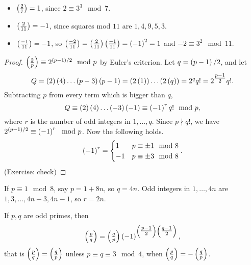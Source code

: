 \begin{example2}
\hfill
\begin{itemize}
\item $ \left( \tfrac{2}{7} \right) = 1 $, since $ 2 \equiv 3^3 \mod 7 $.
\item $ \left( \tfrac{2}{11} \right) = -1 $, since squares mod $ 11 $ are $ 1, 4, 9, 5, 3 $.
\item $ \left( \tfrac{-1}{11} \right) = -1 $, so $ \left( \tfrac{-2}{11} \right) = \left( \tfrac{2}{11} \right)\left( \tfrac{-1}{11} \right) = \left( -1 \right)^2 = 1 $ and $ -2 \equiv 3^2 \mod 11 $.
\end{itemize}
\end{example2}

\begin{proof}
$ \left( \tfrac{2}{p} \right) \equiv 2^{\left( p - 1 \right) / 2} \mod p $ by Euler's criterion. Let $ q = \left( p - 1 \right) / 2 $, and let
$$ Q = \left( 2 \right)\left( 4 \right) \dots \left( p - 3 \right)\left( p - 1 \right) = \left( 2\left( 1 \right) \right) \dots \left( 2\left( q \right) \right) = 2^qq! = 2^{\tfrac{p - 1}{2}}q!. $$
Subtracting $ p $ from every term which is bigger than $ q $,
$$ Q \equiv \left( 2 \right)\left( 4 \right) \dots \left( -3 \right)\left( -1 \right) \equiv \left( -1 \right)^rq! \mod p, $$
where $ r $ is the number of odd integers in $ 1, \dots, q $. Since $ p \nmid q! $, we have $ 2^{\left( p - 1 \right) / 2} \equiv \left( -1 \right)^r \mod p $. Now the following holds.
$$ \left( -1 \right)^r = \begin{cases}
1 & p \equiv \pm 1 \mod 8 \\
-1 & p \equiv \pm 3 \mod 8
\end{cases}. $$
(Exercise: check)
\end{proof}

\begin{example2}
If $ p \equiv 1 \mod 8 $, say $ p = 1 + 8n $, so $ q = 4n $. Odd integers in $ 1, \dots, 4n $ are $ 1, 3, \dots, 4n - 3, 4n - 1 $, so $ r = 2n $.
\end{example2}

\begin{theorem}
\label{thm:40}
If $ p, q $ are odd primes, then
$$ \left( \tfrac{p}{q} \right) = \left( \tfrac{q}{p} \right)\left( -1 \right)^{\left( \tfrac{p - 1}{2} \right)\left( \tfrac{q - 1}{2} \right)}, $$
that is $ \left( \tfrac{p}{q} \right) = \left( \tfrac{q}{p} \right) $ unless $ p \equiv q \equiv 3 \mod 4 $, when $ \left( \tfrac{p}{q} \right) = -\left( \tfrac{q}{p} \right) $.
\end{theorem}

